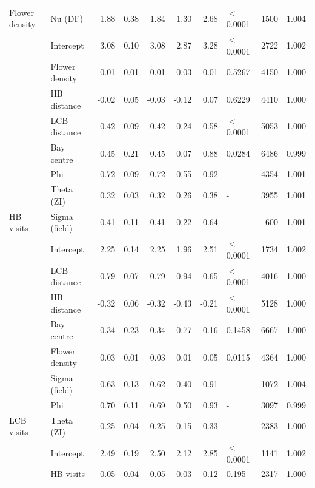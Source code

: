 \documentclass[12pt]{article} %
\begin{document}
\begin{longtable}{l|l|r|r|r|r|r|l|r|r}
\cline{2-10}
\multirow{-5}{*}{\raggedright\arraybackslash Flower density} & Nu (DF) & 1.88 & 0.38 & 1.84 & 1.30 & 2.68 & $<$0.0001 & 1500 & 1.004\\
\cline{1-10}
 & Intercept & 3.08 & 0.10 & 3.08 & 2.87 & 3.28 & $<$0.0001 & 2722 & 1.002\\
\cline{2-10}
 & Flower density & -0.01 & 0.01 & -0.01 & -0.03 & 0.01 & 0.5267 & 4150 & 1.000\\
\cline{2-10}
 & HB distance & -0.02 & 0.05 & -0.03 & -0.12 & 0.07 & 0.6229 & 4410 & 1.000\\
\cline{2-10}
 & LCB distance & 0.42 & 0.09 & 0.42 & 0.24 & 0.58 & $<$0.0001 & 5053 & 1.000\\
\cline{2-10}
 & Bay centre & 0.45 & 0.21 & 0.45 & 0.07 & 0.88 & 0.0284 & 6486 & 0.999\\
\cline{2-10}
 & Phi & 0.72 & 0.09 & 0.72 & 0.55 & 0.92 & - & 4354 & 1.001\\
\cline{2-10}
 & Theta (ZI) & 0.32 & 0.03 & 0.32 & 0.26 & 0.38 & - & 3955 & 1.001\\
\cline{2-10}
\multirow{-8}{*}{\raggedright\arraybackslash HB visits} & Sigma (field) & 0.41 & 0.11 & 0.41 & 0.22 & 0.64 & - & 600 & 1.001\\
\cline{1-10}
 & Intercept & 2.25 & 0.14 & 2.25 & 1.96 & 2.51 & $<$0.0001 & 1734 & 1.002\\
\cline{2-10}
 & LCB distance & -0.79 & 0.07 & -0.79 & -0.94 & -0.65 & $<$0.0001 & 4016 & 1.000\\
\cline{2-10}
 & HB distance & -0.32 & 0.06 & -0.32 & -0.43 & -0.21 & $<$0.0001 & 5128 & 1.000\\
\cline{2-10}
 & Bay centre & -0.34 & 0.23 & -0.34 & -0.77 & 0.16 & 0.1458 & 6667 & 1.000\\
\cline{2-10}
 & Flower density & 0.03 & 0.01 & 0.03 & 0.01 & 0.05 & 0.0115 & 4364 & 1.000\\
\cline{2-10}
 & Sigma (field) & 0.63 & 0.13 & 0.62 & 0.40 & 0.91 & - & 1072 & 1.004\\
\cline{2-10}
 & Phi & 0.70 & 0.11 & 0.69 & 0.50 & 0.93 & - & 3097 & 0.999\\
\cline{2-10}
\multirow{-8}{*}{\raggedright\arraybackslash LCB visits} & Theta (ZI) & 0.25 & 0.04 & 0.25 & 0.15 & 0.33 & - & 2383 & 1.000\\
\cline{1-10}
 & Intercept & 2.49 & 0.19 & 2.50 & 2.12 & 2.85 & $<$0.0001 & 1141 & 1.002\\
\cline{2-10}
 & HB visits & 0.05 & 0.04 & 0.05 & -0.03 & 0.12 & 0.195 & 2317 & 1.000\\

\end{longtable}
\end{document}
